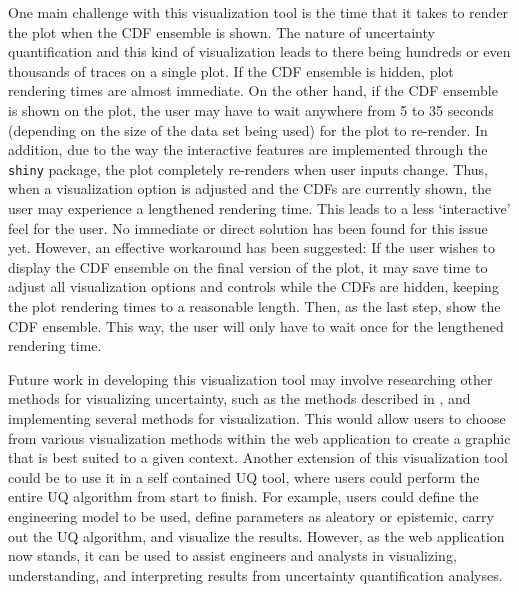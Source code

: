 \documentclass[11pt]{asaproc}\usepackage[]{graphicx}\usepackage[]{color}
\begin{document}
One main challenge with this visualization tool is the time that it takes to render the plot when the CDF ensemble is shown. The nature of uncertainty quantification and this kind of visualization leads to there being hundreds or even thousands of traces on a single plot. If the CDF ensemble is hidden, plot rendering times are almost immediate. On the other hand, if the CDF ensemble is shown on the plot, the user may have to wait anywhere from 5 to 35 seconds (depending on the size of the data set being used) for the plot to re-render. In addition, due to the way the interactive features are implemented through the {\tt shiny} package, the plot completely re-renders when user inputs change. Thus, when a visualization option is adjusted and the CDFs are currently shown, the user may experience a lengthened rendering time. This leads to a less `interactive' feel for the user. No immediate or direct solution has been found for this issue yet. However, an effective workaround has been suggested: If the user wishes to display the CDF ensemble on the final version of the plot, it may save time to adjust all visualization options and controls while the CDFs are hidden, keeping the plot rendering times to a reasonable length. Then, as the last step, show the CDF ensemble. This way, the user will only have to wait once for the lengthened rendering time.

Future work in developing this visualization tool may involve researching other methods for visualizing uncertainty, such as the methods described in \cite{JA2008}, and implementing several methods for visualization. This would allow users to choose from various visualization methods within the web application to create a graphic that is best suited to a given context. Another extension of this visualization tool could be to use it in a self contained UQ tool, where users could perform the entire UQ algorithm from start to finish. For example, users could define the engineering model to be used, define parameters as aleatory or epistemic, carry out the UQ algorithm, and visualize the results. However, as the web application now stands, it can be used to assist engineers and analysts in visualizing, understanding, and interpreting results from uncertainty quantification analyses. 


\newpage




\newpage
\appendix
\end{document}
